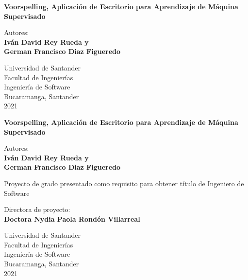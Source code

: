 
\begin{titlepage}
    \begin{center}
        \textbf{Voorspelling, Aplicación de Escritorio para Aprendizaje de Máquina Supervisado}
        \vfill
        
        Autores:\\
        \textbf{
        Iván David Rey Rueda y\\
        German Francisco Diaz Figueredo}
        
        \vfill
        
        Universidad de Santander\\
        Facultad de Ingenierías\\
        Ingeniería de Software\\
        Bucaramanga, Santander\\
        2021
    \end{center}
\thispagestyle{otherplain}   
\pagebreak
    
\begin{center}
        \textbf{Voorspelling, Aplicación de Escritorio para Aprendizaje de Máquina Supervisado}
        
        \vfill
        
        Autores:\\
        \textbf{
        Iván David Rey Rueda y\\
        German Francisco Diaz Figueredo}
        
        \vfill
        Proyecto de grado presentado como requisito para obtener título de Ingeniero de Software
        
        \vfill
        
        Directora de proyecto:\\
        \textbf{Doctora Nydia Paola Rondón Villarreal}
        
        \vfill
        
        Universidad de Santander\\
        Facultad de Ingenierías\\
        Ingeniería de Software\\
        Bucaramanga, Santander\\
        2021
        
    \end{center}
\thispagestyle{otherplain}   
\end{titlepage}
